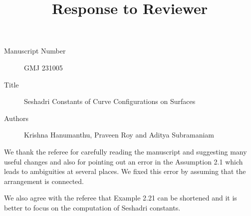 \documentclass[12pt,twoside,reqno]{amsart}
\numberwithin{equation}{section}
\theoremstyle{definition}
\begin{document}
\title{Response to Reviewer}
\begin{description}
\item [Manuscript Number] GMJ 231005 \\
\item [Title] Seshadri Constants of Curve Configurations on Surfaces
\item [Authors] Krishna Hanumanthu, Praveen Roy and Aditya Subramaniam
\end{description}

We thank the referee for carefully reading the manuscript and suggesting 
many useful changes and also for pointing out an error in the Assumption 2.1 which leads to 
ambiguities at several places. We fixed this error by assuming that the arrangement is connected. 

We also agree with the referee that Example 2.21 can be shortened and it is better to 
focus on the computation of Seshadri constants. 
\end{document}
